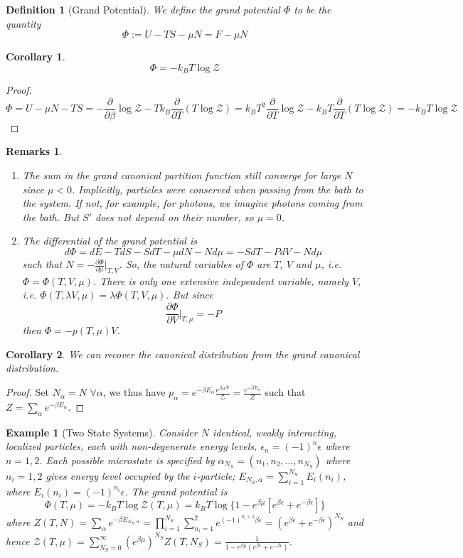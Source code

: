 \documentclass[a4paper]{article}
\newtheorem{eg}{Example}[section]
\newtheorem{remarks}{Remarks}[section]
\theoremstyle{new}
\newtheorem{defi}{Definition}[section]
\newtheorem{cor}{Corollary}[section]
\begin{document}
\begin{defi}[Grand Potential]
We define the grand potential $\Phi$ to be the quantity
$$\Phi:=U-TS-\mu N=F-\mu N$$
\end{defi}
\begin{cor}
$$\Phi=-k_BT\log\mathcal{Z}$$
\end{cor}
\begin{proof}
$$\Phi=U-\mu N-TS=-\frac{\partial}{\partial\beta}\log\mathcal{Z}-Tk_B\frac{\partial}{\partial T}(T\log\mathcal{Z})=k_BT^2\frac{\partial}{\partial T}\log\mathcal{Z}-k_BT\frac{\partial}{\partial T}(T\log\mathcal{Z})=-k_BT\log\mathcal{Z}$$
\end{proof}
\begin{remarks}\leavevmode
\begin{enumerate}
\item The sum in the grand canonical partition function still converge for large $N$ since $\mu<0$. Implicitly, particles were conserved when passing from the bath to the system. If not, for example, for photons, we imagine photons coming from the bath. But $S'$ does not depend on their number, so $\mu=0$. 
\item The differential of the grand potential is
$$d\Phi=dE-TdS-SdT-\mu dN-Nd\mu=-SdT-PdV-Nd\mu$$
such that $N=-\frac{\partial\Phi}{\partial\mu}|_{T,V}$. So, the natural variables of $\Phi$ are $T$, $V$ and $\mu$, i.e. $\Phi=\Phi(T,V,\mu)$. There is only one extensive independent variable, namely $V$, i.e. $\Phi(T,\lambda V,\mu)=\lambda\Phi(T,V,\mu)$. But since 
$$\frac{\partial\Phi}{\partial V}\bigg|_{T,\mu}=-P$$
then $\Phi=-p(T,\mu)V$.
\end{enumerate}
\end{remarks}
\begin{cor}
We can recover the canonical distribution from the grand canonical distribution.
\end{cor}
\begin{proof}
Set $N_\alpha=N$ $\forall\alpha$, we thus have $p_\alpha=e^{-\beta E_\alpha}\frac{e^{\beta\mu N}}{\mathcal{Z}}=\frac{e^{-\beta E_\alpha}}{Z}$ such that $Z=\sum_\alpha e^{-\beta E_\alpha}$.
\end{proof}
\begin{eg}[Two State Systems]
Consider $N$ identical, weakly interacting, localized particles, each with non-degenerate energy levels, $\epsilon_n=(-1)^n\epsilon$ where $n=1,2$. Each possible microstate is specified by $\alpha_{N_S}=(n_1,n_2,...,n_{N_S})$ where $n_i=1,2$ gives energy level occupied by the $i$-particle; $E_{N_S,\alpha}=\sum_{i=1}^{N_S}E_i(n_i)$, where $E_i(n_i)=(-1)^{n_i}\epsilon$. The grand potential is
$$\Phi(T,\mu)=-k_BT\log\mathcal{Z}(T,\mu)=k_BT\log\{1-e^{\beta\mu}[e^{\beta\epsilon}+e^{-\beta\epsilon}]\}$$
where $Z(T,N)=\sum_\alpha e^{-\beta E_{N_S,\alpha}}=\prod_{i=1}^{N_S}\sum_{n_i=1}^2e^{(-1)^{n_i+1}\beta\epsilon}=(e^{\beta\epsilon}+e^{-\beta\epsilon})^{N_S}$ and hence $\mathcal{Z}(T,\mu)=\sum_{N_S=0}^\infty (e^{\beta\mu})^{N_S}Z(T,N_S)=\frac{1}{1-e^{\beta\mu}(e^{\beta\epsilon}+e^{-\beta\epsilon})}$.
\end{eg}
\end{document}
